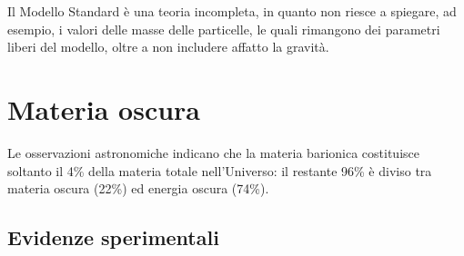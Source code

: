 
Il Modello Standard è una teoria incompleta, in quanto non riesce a spiegare, ad esempio, i valori delle masse delle particelle, le quali rimangono dei parametri liberi del modello, oltre a non includere affatto la gravità.

\section{Materia oscura}

Le osservazioni astronomiche indicano che la materia barionica costituisce soltanto il 4\% della materia totale nell'Universo: il restante 96\% è diviso tra materia oscura (22\%) ed energia oscura (74\%).

\subsection{Evidenze sperimentali}

